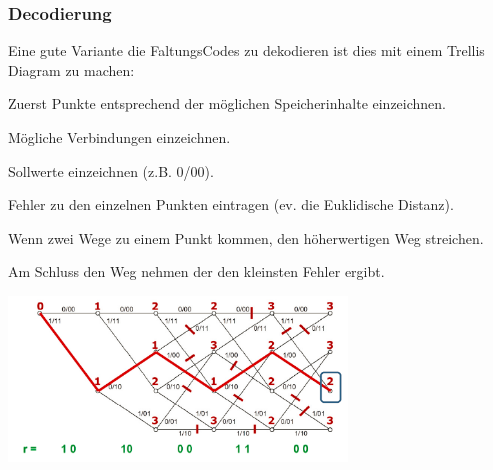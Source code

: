 \subsubsection{Decodierung}
Eine gute Variante die FaltungsCodes zu dekodieren ist dies mit einem Trellis
Diagram zu machen: \\
\begin{minipage}{10cm}
	\begin{liste}
		\item Zuerst Punkte entsprechend der m\"oglichen Speicherinhalte einzeichnen.
		\item M\"ogliche Verbindungen einzeichnen.
		\item Sollwerte einzeichnen (z.B. 0/00).
		\item Fehler zu den einzelnen Punkten eintragen (ev. die Euklidische Distanz).
		\item Wenn zwei Wege zu einem Punkt kommen, den h\"oherwertigen Weg streichen.
		\item Am Schluss den Weg nehmen der den kleinsten Fehler ergibt.
	\end{liste}
\end{minipage}
\begin{minipage}{9cm}
	\includegraphics[width=9cm]{./bilder/Trelli.png}
\end{minipage}

